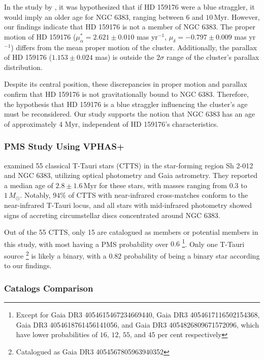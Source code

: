\documentclass[fleqn,usenatbib,usedcolumn,useAMS]{mnras}
\begin{document}
In the study by \citet{2018AA...610A..30A}, it was hypothesized that if HD 159176 were a blue straggler, it would imply an older age for NGC 6383, ranging between $6$ and $10$\,Myr. However, our findings indicate that HD 159176 is not a member of NGC 6383. The proper motion of HD 159176 ($\mu_\alpha^* = 2.621 \pm 0.010$ mas yr$^{-1}$, $\mu_\delta = -0.797 \pm 0.009$ mas yr$^{-1}$) differs from the mean proper motion of the cluster. Additionally, the parallax of HD 159176 ($1.153 \pm 0.024$ mas) is outside the $2\sigma$ range of the cluster's parallax distribution.

Despite its central position, these discrepancies in proper motion and parallax confirm that HD 159176 is not gravitationally bound to NGC 6383. Therefore, the hypothesis that HD 159176 is a blue straggler influencing the cluster's age must be reconsidered. Our study supports the notion that NGC 6383 has an age of approximately 4 Myr, independent of HD 159176's characteristics.
\subsubsection{PMS Study Using VPHAS+}

\citet{2019MNRAS.484.5102K} examined 55 classical T-Tauri stars (CTTS) in the star-forming region Sh 2-012 and NGC 6383, utilizing optical photometry and Gaia astrometry. They reported a median age of $2.8 \pm 1.6\,\mathrm{Myr}$ for these stars, with masses ranging from $0.3$ to $1\,M_\odot$. Notably, $94\%$ of CTTS with near-infrared cross-matches conform to the near-infrared T-Tauri locus, and all stars with mid-infrared photometry showed signs of accreting circumstellar discs concentrated around NGC 6383.

Out of the 55 CTTS, only 15 are catalogued as members or potential members in this study, with most having a PMS probability over $0.6$ \footnote{Except for Gaia DR3 4054615467234669440, Gaia DR3 4054617116502154368, Gaia DR3 4054618761456141056, and Gaia DR3 4054826809671572096, which have lower probabilities of $16$, $12$, $55$, and $45$ per cent respectively}. Only one T-Tauri source \footnote{Catalogued as Gaia DR3 4054567805963940352} is likely a binary, with a $0.82$ probability of being a binary star according to our findings.

\subsubsection{Catalogs Comparison}
\end{document}
